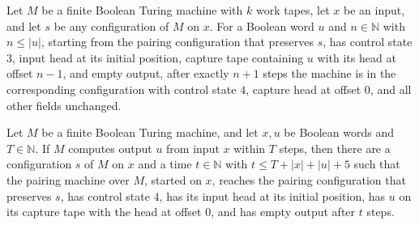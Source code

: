 \begin{lemma}
\label{Complexity.satPair_rewind}
\leanok
{}
Let $M$ be a finite Boolean Turing machine with $k$ work tapes, let $x$ be an input, and
let $s$ be any configuration of $M$ on $x$. For a Boolean word $u$ and $n\in\mathbb{N}$
with $n\le |u|$, starting from the pairing configuration that preserves $s$, has control
state $3$, input head at its initial position, capture tape containing $u$ with its head
at offset $n-1$, and empty output, after exactly $n+1$ steps the machine is in the
corresponding configuration with control state $4$, capture head at offset $0$, and all
other fields unchanged.
\end{lemma}

\begin{lemma}
\label{Complexity.satPair_start}
\leanok
{}
Let $M$ be a finite Boolean Turing machine, and let $x,u$ be Boolean words and
$T\in\mathbb{N}$. If $M$ computes output $u$ from input $x$ within $T$ steps, then there
are a configuration $s$ of $M$ on $x$ and a time $t\in\mathbb{N}$ with $t\le
T+|x|+|u|+5$ such that the pairing machine over $M$, started on $x$, reaches the pairing
configuration that preserves $s$, has control state $4$, has its input head at its
initial position, has $u$ on its capture tape with the head at offset $0$, and has empty
output after $t$ steps.
\end{lemma}

